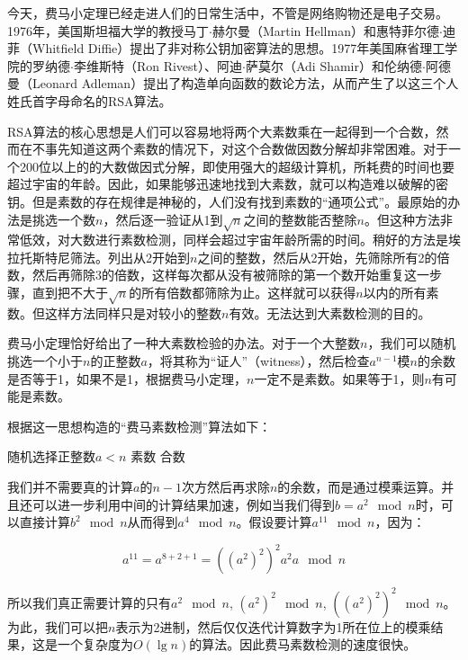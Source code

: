 \documentclass[b5paper]{ctexart}
\begin{document}
\vspace{5mm}

今天，费马小定理已经走进人们的日常生活中，不管是网络购物还是电子交易。1976年，美国斯坦福大学的教授马丁$\cdot$赫尔曼（Martin Hellman）和惠特菲尔德$\cdot$迪菲（Whitfield Diffie）提出了非对称公钥加密算法的思想。1977年美国麻省理工学院的罗纳德$\cdot$李维斯特（Ron Rivest）、阿迪$\cdot$萨莫尔（Adi Shamir）和伦纳德$\cdot$阿德曼（Leonard Adleman）提出了构造单向函数的数论方法，从而产生了以这三个人姓氏首字母命名的RSA算法。

RSA算法的核心思想是人们可以容易地将两个大素数乘在一起得到一个合数，然而在不事先知道这两个素数的情况下，对这个合数做因数分解却非常困难。对于一个200位以上的的大数做因式分解，即使用强大的超级计算机，所耗费的时间也要超过宇宙的年龄。因此，如果能够迅速地找到大素数，就可以构造难以破解的密钥。但是素数的存在规律是神秘的，人们没有找到素数的“通项公式”。最原始的办法是挑选一个数$n$，然后逐一验证从1到$\sqrt{n}$之间的整数能否整除$n$。但这种方法非常低效，对大数进行素数检测，同样会超过宇宙年龄所需的时间。稍好的方法是埃拉托斯特尼筛法。列出从2开始到$n$之间的整数，然后从2开始，先筛除所有2的倍数，然后再筛除3的倍数，这样每次都从没有被筛除的第一个数开始重复这一步骤，直到把不大于$\sqrt{n}$的所有倍数都筛除为止。这样就可以获得$n$以内的所有素数。但这样方法同样只是对较小的整数$n$有效。无法达到大素数检测的目的。

费马小定理恰好给出了一种大素数检验的办法。对于一个大整数$n$，我们可以随机挑选一个小于$n$的正整数$a$，将其称为“证人”（witness），然后检查$a^{n-1}$模$n$的余数是否等于1，如果不是1，根据费马小定理，$n$一定不是素数。如果等于1，则$n$有可能是素数。

根据这一思想构造的“费马素数检测”算法如下：

\begin{algorithmic}[1]
  \State 随机选择正整数$a < n$
    \State \Return 素数
  \Else
    \State \Return 合数
  \EndIf
\EndFunction
\end{algorithmic}

我们并不需要真的计算$a$的$n-1$次方然后再求除$n$的余数，而是通过模乘运算。并且还可以进一步利用中间的计算结果加速，例如当我们得到$b = a^2 \mod n$时，可以直接计算$b^2 \mod n$从而得到$a^4 \mod n$。假设要计算$a^{11} \mod n$，因为：

\[
a^{11} = a^{8 + 2 + 1} = ((a^2)^2)^2a^2a \mod n
\]

所以我们真正需要计算的只有$a^2 \mod n$, $(a^2)^2 \mod n$, $((a^2)^2)^2 \mod n$。为此，我们可以把$n$表示为2进制，然后仅仅迭代计算数字为1所在位上的模乘结果，这是一个复杂度为$O(\lg n)$的算法。因此费马素数检测的速度很快。
\end{document}
